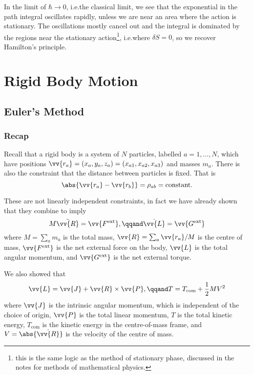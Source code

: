 \documentclass[fleqn]{NotesClass}
\newcommand*{\ext}{\mathrm{ext}}
\begin{document}
    In the limit of \(\hbar \to 0\), i.e.\@ the classical limit, we see that the exponential in the path integral oscillates rapidly, unless we are near an area where the action is stationary.
    The oscillations mostly cancel out and the integral is dominated by the regions near the stationary action\footnote{this is the same logic as the method of stationary phase, discussed in the notes for methods of mathematical physics.}, i.e.\@ where \(\delta S = 0\), so we recover Hamilton's principle.
    
    \part{Rigid Body Motion}
    \chapter{Euler's Method}
    \section{Recap}
    Recall that a rigid body is a system of \(N\) particles, labelled \(a = 1, \dotsc, N\), which have positions \(\vv{r_a} = (x_a, y_a, z_a) = (x_{a1}, x_{a2}, x_{a3})\) and masses \(m_a\).
    There is also the constraint that the distance between particles is fixed.
    That is
    \begin{equation}
        \abs{\vv{r_a} - \vv{r_b}} = \rho_{ab} = \text{constant}.
    \end{equation}
    
    These are not linearly independent constraints, in fact we have already shown that they combine to imply
    \begin{equation}
        M \ddot{\vv{R}} = \vv{F^{\ext}}, \qqand \dot{\vv{L}} = \vv{G^{\ext}}
    \end{equation}
    where \(M = \sum_a m_a\)  is the total mass, \(\vv{R} = \sum_a \vv{r_a}/M\) is the centre of mass, \(\vv{F^{\ext}}\) is the net external force on the body, \(\vv{L}\) is the total angular momentum, and \(\vv{G^{\ext}}\) is the net external torque.
    
    We also showed that
    \begin{equation}
        \vv{L} = \vv{J} + \vv{R} \times \vv{P}, \qqand T = T_{\mathrm{com}} + \frac{1}{2}MV^2
    \end{equation}
    where \(\vv{J}\) is the intrinsic angular momentum, which is independent of the choice of origin, \(\vv{P}\) is the total linear momentum, \(T\) is the total kinetic energy, \(T_{\mathrm{com}}\) is the kinetic energy in the centre-of-mass frame, and \(V = \abs{\dot{\vv{R}}}\) is the velocity of the centre of mass.
    
\end{document}
